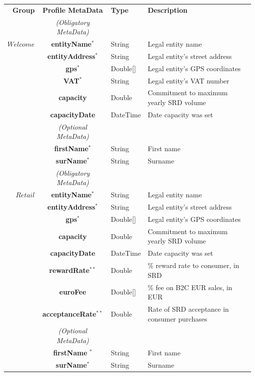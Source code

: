 \setlength{\tabcolsep}{10pt}
\begin{table}[H]
\begin{centering}
\small
{
\begin{tabular}{ r | c | l | l }
\hline
\textbf{Group}	& {\bf Profile MetaData} & {\bf Type} & {\bf Description} \\
\Xhline{1.5pt}
			& \emph{(Obligatory MetaData)} & & \\
\cline{2-2}
$Welcome$	& {\bf entityName}$^*$		&String	& Legal entity name \\
			& {\bf entityAddress}$^*$		&String	& Legal entity's street address \\
			& {\bf gps}$^*$				&Double[]	& Legal entity's GPS coordinates \\			
			& {\bf VAT}$^*$				&String	& Legal entity's VAT number \\
			& {\bf capacity}				&Double	& Commitment to maximum yearly SRD volume \\
			& {\bf capacityDate}			&DateTime & Date capacity was set \\
\cline{2-2}
			 & \emph{(Optional MetaData)}& & \\
\cline{2-2}
			& {\bf firstName}$^*$			&String	& First name \\
			& {\bf surName}$^*$			&String	& Surname \\
\Xhline{1.5pt}
			& \emph{(Obligatory MetaData)} & & \\
\cline{2-2}
$Retail$		& {\bf entityName}$^*$		&String	& Legal entity name \\
			& {\bf entityAddress}$^*$		&String	& Legal entity's street address \\
			& {\bf gps}$^*$				&Double[]	& Legal entity's GPS coordinates \\			
			& {\bf capacity}				&Double	& Commitment to maximum yearly SRD volume \\
			& {\bf capacityDate}			&DateTime & Date capacity was set \\
			& {\bf rewardRate}$^{**}$		&Double	& \% reward rate to consumer, in SRD \\
			& {\bf euroFee}				&Double[]	& \% fee on B2C EUR sales, in EUR \\
			& {\bf acceptanceRate}$^{**}$	&Double	& Rate of SRD acceptance in consumer purchases\\
\cline{2-2}
			 & \emph{(Optional MetaData)}& & \\
\cline{2-2}
			& {\bf firstName	}$^*$			&String	& First name \\
			& {\bf surName}$^*$			&String	& Surname \\

\end{tabular}}
\end{centering}
\end{table}
